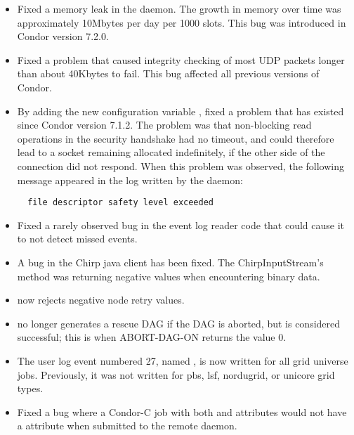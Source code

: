 \begin{itemize}

\item Fixed a memory leak in the  daemon.
  The growth in memory over time was approximately 10Mbytes per day
  per 1000 slots.
  This bug was introduced in Condor version 7.2.0.

\item Fixed a problem that caused integrity checking of most UDP packets
  longer than about 40Kbytes to fail.
  This bug affected all previous versions of Condor.

\item By adding the new configuration variable
  , fixed a problem
  that has existed since Condor version 7.1.2. 
  The problem was that non-blocking read
  operations in the security handshake had no timeout,
  and could therefore lead to a socket remaining allocated indefinitely,
  if the other side of the connection did not respond.
  When this problem was observed,
  the following message appeared in the log written by the 
  daemon:
\begin{verbatim}
  file descriptor safety level exceeded
\end{verbatim}

\item Fixed a rarely observed bug in the event log reader code
  that could cause it to not detect missed events.

\item A bug in the Chirp java client has been fixed.
  The ChirpInputStream's  method was returning
  negative values when encountering binary data.

\item {} now rejects negative node retry values.

\item {} no longer generates a rescue DAG if the DAG is
  aborted, but is considered successful;
  this is when ABORT-DAG-ON returns the value 0.

\item The user log event numbered 27,
  named ,
  is now written for all grid universe jobs.
  Previously, it was not written for pbs, lsf, nordugrid, or unicore grid types.

\item Fixed a bug where a Condor-C job with both 
and  attributes would not have a
 attribute when submitted to the remote
 daemon.


\end{itemize}
